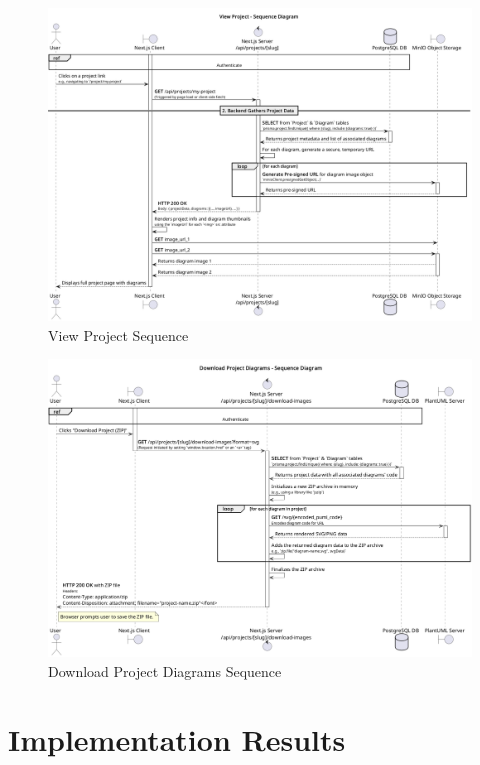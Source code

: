 \begin{figure}[H]
\centering
\includegraphics[width=1\textwidth]{conception/SprintIII/sequence_diagrams/sequence_projectManagement_3_2_ViewProjectDetails.png}
\caption{View Project Sequence}
\label{fig:seq_view_project}
\end{figure}

\begin{figure}[H]
\centering
\includegraphics[width=1\textwidth]{conception/SprintIII/sequence_diagrams/sequence_projectManagement_3_5_DownloadProjectDiagramsAsZip.png}
\caption{Download Project Diagrams Sequence}
\label{fig:seq_download_project}
\end{figure}

\section{Implementation Results}

